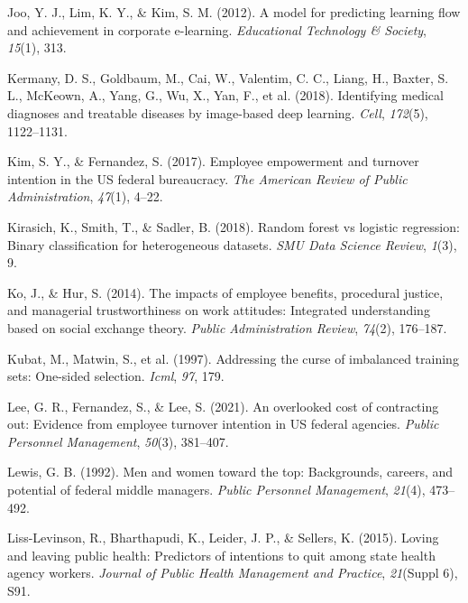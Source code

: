 \documentclass[
  man]{apa7}
\newlength{\cslhangindent}
\newlength{\cslentryspacingunit} %
\newenvironment{CSLReferences}[2] %
 {%
  \setlength{\parindent}{0pt}
  \ifodd #1
  \let\oldpar\par
  \def\par{\hangindent=\cslhangindent\oldpar}
  \fi
  \setlength{\parskip}{#2\cslentryspacingunit}
 }%
 {}
\begin{document}
\begin{CSLReferences}{1}{0}
\leavevmode{}%
Joo, Y. J., Lim, K. Y., \& Kim, S. M. (2012). A model for predicting learning flow and achievement in corporate e-learning. \emph{Educational Technology \& Society}, \emph{15}(1), 313.

\leavevmode{}%
Kermany, D. S., Goldbaum, M., Cai, W., Valentim, C. C., Liang, H., Baxter, S. L., McKeown, A., Yang, G., Wu, X., Yan, F., et al. (2018). Identifying medical diagnoses and treatable diseases by image-based deep learning. \emph{Cell}, \emph{172}(5), 1122--1131.

\leavevmode{}%
Kim, S. Y., \& Fernandez, S. (2017). Employee empowerment and turnover intention in the US federal bureaucracy. \emph{The American Review of Public Administration}, \emph{47}(1), 4--22.

\leavevmode{}%
Kirasich, K., Smith, T., \& Sadler, B. (2018). Random forest vs logistic regression: Binary classification for heterogeneous datasets. \emph{SMU Data Science Review}, \emph{1}(3), 9.

\leavevmode{}%
Ko, J., \& Hur, S. (2014). The impacts of employee benefits, procedural justice, and managerial trustworthiness on work attitudes: Integrated understanding based on social exchange theory. \emph{Public Administration Review}, \emph{74}(2), 176--187.

\leavevmode{}%
Kubat, M., Matwin, S., et al. (1997). Addressing the curse of imbalanced training sets: One-sided selection. \emph{Icml}, \emph{97}, 179.

\leavevmode{}%
Lee, G. R., Fernandez, S., \& Lee, S. (2021). An overlooked cost of contracting out: Evidence from employee turnover intention in US federal agencies. \emph{Public Personnel Management}, \emph{50}(3), 381--407.

\leavevmode{}%
Lewis, G. B. (1992). Men and women toward the top: Backgrounds, careers, and potential of federal middle managers. \emph{Public Personnel Management}, \emph{21}(4), 473--492.

\leavevmode{}%
Liss-Levinson, R., Bharthapudi, K., Leider, J. P., \& Sellers, K. (2015). Loving and leaving public health: Predictors of intentions to quit among state health agency workers. \emph{Journal of Public Health Management and Practice}, \emph{21}(Suppl 6), S91.


\end{CSLReferences}
\end{document}
